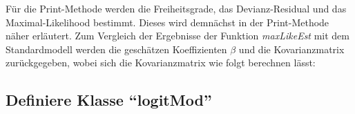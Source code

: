 \documentclass[12pt,]{article}
\newenvironment{Shaded}{\begin{snugshade}}{\end{snugshade}}
\newcommand{\KeywordTok}[1]{\textcolor[rgb]{0.13,0.29,0.53}{\textbf{#1}}}
\newcommand{\DecValTok}[1]{\textcolor[rgb]{0.00,0.00,0.81}{#1}}
\newcommand{\StringTok}[1]{\textcolor[rgb]{0.31,0.60,0.02}{#1}}
\newcommand{\CommentTok}[1]{\textcolor[rgb]{0.56,0.35,0.01}{\textit{#1}}}
\newcommand{\OperatorTok}[1]{\textcolor[rgb]{0.81,0.36,0.00}{\textbf{#1}}}
\newcommand{\NormalTok}[1]{#1}
\begin{document}
\begin{Shaded}
\end{Shaded}

Für die Print-Methode werden die Freiheitsgrade, das Devianz-Residual
und das Maximal-Likelihood bestimmt. Dieses wird demnächst in der
Print-Methode näher erläutert. Zum Vergleich der Ergebnisse der Funktion
\emph{maxLikeEst} mit dem Standardmodell werden die geschätzen
Koeffizienten \(\beta\) und die Kovarianzmatrix zurückgegeben, wobei
sich die Kovarianzmatrix wie folgt berechnen lässt:

\subsection{\texorpdfstring{Definiere Klasse
``logitMod''}{Definiere Klasse logitMod}}\label{definiere-klasse-logitmod}
\end{document}
